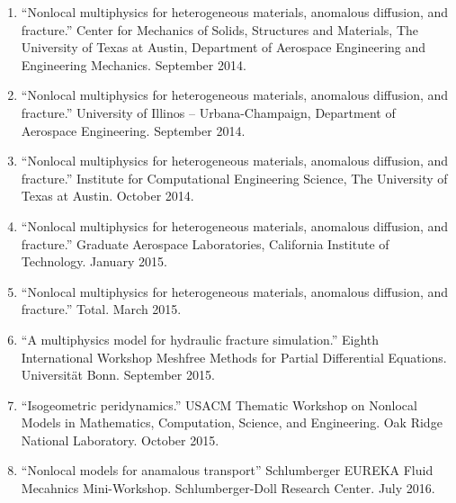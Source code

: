\begin{enumerate}[resume]
    \item ``Nonlocal multiphysics for heterogeneous materials, anomalous diffusion, and fracture.'' Center for Mechanics of Solids, Structures and Materials, The University of Texas at Austin, Department of Aerospace Engineering and Engineering Mechanics. September 2014.
    \item ``Nonlocal multiphysics for heterogeneous materials, anomalous diffusion, and fracture.'' University of Illinos -- Urbana-Champaign, Department of Aerospace Engineering. September 2014.
    \item ``Nonlocal multiphysics for heterogeneous materials, anomalous diffusion, and fracture.'' Institute for Computational Engineering Science, The University of Texas at Austin. October 2014.
    \item ``Nonlocal multiphysics for heterogeneous materials, anomalous diffusion, and fracture.'' Graduate Aerospace Laboratories, California Institute of Technology. January 2015.
    \item ``Nonlocal multiphysics for heterogeneous materials, anomalous diffusion, and fracture.'' Total. March 2015.
    \item ``A multiphysics model for hydraulic fracture simulation.''  Eighth International Workshop Meshfree Methods for Partial Differential Equations. Universit\"{a}t Bonn. September 2015.
    \item ``Isogeometric peridynamics.'' USACM Thematic Workshop on Nonlocal Models in Mathematics, Computation, Science, and Engineering.  Oak Ridge National Laboratory. October 2015.
    \item ``Nonlocal models for anamalous transport'' Schlumberger EUREKA Fluid Mecahnics Mini-Workshop. Schlumberger-Doll Research Center. July 2016.
\end{enumerate}
\else
%
\ifdefined\ispdf
